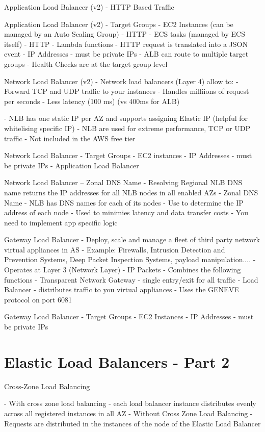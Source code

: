 Application Load Balancer (v2) - HTTP Based Traffic

Application Load Balancer (v2) - Target Groups
- EC2 Instances (can be managed by an Auto Scaling Group) - HTTP
- ECS tasks (managed by ECS itself) - HTTP
- Lambda functions - HTTP request is translated into a JSON event
- IP Addresses - must be private IPs
- ALB can route to multiple target groups
- Health Checks are at the target group level

Network Load Balancer (v2)
- Network load balancers (Layer 4) allow to:
- Forward TCP and UDP traffic to your instances
- Handles milliions of request per seconds
- Less latency (100 ms) (vs 400ms for ALB)

- NLB has one static IP per AZ and supports assigning Elastic IP (helpful for whitelising specific IP)
- NLB are used for extreme performance, TCP or UDP traffic
- Not included in the AWS free tier

Network Load Balancer - Target Groups
- EC2 instances
- IP Addresses - must be private IPs
- Application Load Balancer

Network Load Balancer -- Zonal DNS Name
- Resolving Regional NLB DNS name returns the IP addresses for all NLB nodes in all enabled AZs
- Zonal DNS Name
- NLB has DNS names for each of its nodes
- Use to determine the IP address of each node
- Used to minimies latency and data transfer costs
- You need to implement app specific logic

Gateway Load Balancer
- Deploy, scale and manage a fleet of third party network virtual appliances in AS
- Example: Firewalls, Intrusion Detection and Prevention Systems, Deep Packet Inspection Systems, payload manipulation....
- Operates at Layer 3 (Network Layer) - IP Packets
- Combines the following functions
- Transparent Network Gateway - single entry/exit for all traffic
- Load Balancer - distributes traffic to you virtual appliances
- Uses the GENEVE protocol on port 6081

Gateway Load Balancer - Target Groups
- EC2 Instances
- IP Addresses - must be private IPs


\section{Elastic Load Balancers - Part 2}
Cross-Zone Load Balancing

- With cross zone load balancing - each load balancer instance distributes evenly across all registered instances in all AZ
- Without Cross Zone Load Balancing - Requests are distributed in the instances of the node of the Elastic Load Balancer

